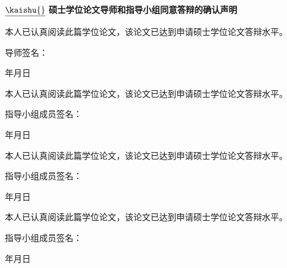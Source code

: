 \newpage
\pagestyle{empty}

\vskip 2cm

\begin{center}
  \bf\Large $\underline{\mbox{\kaishu {}}}\,\,$硕士学位论文导师和指导小组同意答辩的确认声明
\end{center}

\vskip 1cm

\normalsize
本人已认真阅读此篇学位论文，该论文已达到申请硕士学位论文答辩水平。

\vskip 1cm

\hfill 导师签名：\underline{\hspace{5cm}}

\vskip 0.3cm

\hfill 年\qquad 月\qquad 日

\vskip 2cm

\normalsize
本人已认真阅读此篇学位论文，该论文已达到申请硕士学位论文答辩水平。

\vskip 0.8cm

\hfill 指导小组成员签名：\underline{\hspace{5cm}}

\hfill 年\qquad 月\qquad 日

\vskip 2cm

\normalsize
本人已认真阅读此篇学位论文，该论文已达到申请硕士学位论文答辩水平。

\vskip 0.8cm

\hfill 指导小组成员签名：\underline{\hspace{5cm}}

\hfill 年\qquad 月\qquad 日

\vskip 2cm

\normalsize
本人已认真阅读此篇学位论文，该论文已达到申请硕士学位论文答辩水平。

\vskip 0.8cm

\hfill 指导小组成员签名：\underline{\hspace{5cm}}

\hfill 年\qquad 月\qquad 日
